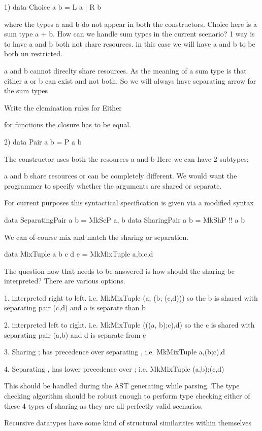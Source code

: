 1) data Choice a b = L a | R b

where the types a and b do not appear in both the constructors.
Choice here is a sum type a + b. How can we handle sum types in the current scenario?
1 way is to have a and b both not share resources. in this case we will have
a and b to be both un restricted.

a and b cannot direclty share resources. As the meaning of a sum type is that
either a or b can exist and not both. So we will always have separating arrow
for the sum types

Write the elemination rules for Either

for functions the closure has to be equal.

2) data Pair a b = P a b

The constructor uses both the resources a and b
Here we can have 2 subtypes:

a and b share resources or can be completely different.
We would want the programmer to specify whether the arguments are shared or separate.

For current purposes this syntactical specification is given via a modified syntax

data SeparatingPair a b = MkSeP a, b
data SharingPair a b = MkShP !! a b

We can of-course mix and match the sharing or separation.

data MixTuple a b c d e = MkMixTuple a,b;c,d

The question now that needs to be answered is how should the sharing be interpreted?
There are various options.

1. interpreted right to left. i.e. MkMixTuple (a, (b; (c,d)))
   so the b is shared with separating pair (c,d) and a is separate than b

2. interpreted left to right. i.e. MkMixTuple (((a, b);c),d)
   so the c is shared with separating pair (a,b) and d is separate from c

3. Sharing ; has precedence over separating , i.e. MkMixTuple a,(b;c),d

4. Separating , has lower precedence over ; i.e. MkMixTuple (a,b);(c,d)

This should be handled during the AST generating while parsing.
The type checking algorithm should be robust enough
to perform type checking either of these 4 types of sharing as they are
all perfectly valid scenarios.

Recursive datatypes have some kind of structural similarities within themselves

